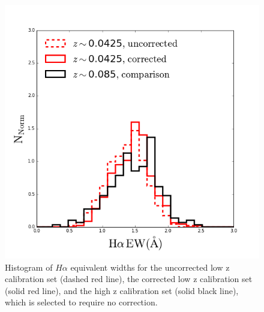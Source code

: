 \documentclass[iop]{emulateapj}
\begin{document}
\begin{figure}
	\centering
	\includegraphics[width=1 \columnwidth]{hist_10_0.png}
	\caption{Histogram of $H\alpha$ equivalent widths for the uncorrected low z calibration set (dashed red line), the corrected low z calibration set (solid red line), and the high z calibration set (solid black line), which is selected to require no correction.}
     \label{fig:hist}

\end{figure}
\end{document}
